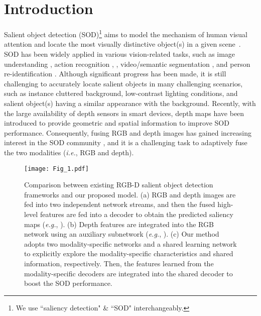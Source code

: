 \documentclass[10pt,twocolumn,letterpaper]{article}
\def\ie{\emph{i.e.}}
\def\eg{\emph{e.g.}}
\begin{document}
\section{Introduction}

Salient object detection (SOD)\footnote{We use ``saliency detection" \& ``SOD" interchangeably.} aims to model the mechanism of human visual
attention and locate the most visually distinctive object(s) in a given scene~\cite{peng2014rgbd}. SOD has been widely applied in various vision-related tasks, such as image understanding \cite{zhu2014unsupervised}, action recognition \cite{rapantzikos2009dense}, \cite{shimoda2016distinct}, video/semantic segmentation \cite{wang2017saliency,shimoda2016distinct}, and person re-identification \cite{zhao2016person}. Although significant progress has been made, it is still challenging to accurately locate salient objects in many challenging scenarios, such as instance cluttered background, low-contrast lighting conditions, and salient object(s) having a similar appearance with the background. Recently, with the large availability of depth sensors in smart devices, depth maps have been introduced to provide geometric and spatial information to improve SOD performance. Consequently, fusing RGB and depth images has gained increasing interest in the SOD community \cite{fan2019rethinking,cascaded_rgbd_sod,liu2021vst,zhou2021rgb,fu2020jl,zhang2020uc,chen2021cnn,li2021hierarchical,zhao2021rgb}, and it is a challenging task to adaptively fuse the two modalities (\ie, RGB and depth).



\begin{figure}[t]
    \centering
    \texttt{[image: Fig\_1.pdf]}
    \caption{Comparison between existing RGB-D salient object detection frameworks and our proposed model. (a) RGB and depth images are fed into two independent network streams, and then the fused high-level features are fed into a decoder to obtain the predicted saliency maps (\eg, \cite{chen2018progressively,liu2019two,chen2019three,han2017cnns}). (b) Depth features are integrated into the RGB network using an auxiliary subnetwork (\eg, \cite{chen2019multi,zhao2019contrast,zhu2019pdnet,fan2020bbs,zhai2021bifurcated}). (c) Our method adopts two modality-specific networks and a shared learning network to explicitly explore the modality-specific characteristics and shared information, respectively. Then, the features learned from the modality-specific decoders are integrated into the shared decoder to boost the SOD performance.
    }\vspace{-0.45cm}
    \label{fig01}
\end{figure}
\end{document}
